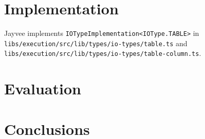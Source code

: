 \chapter{Implementation}
\label{chapter:Implementation}

Jayvee implements \texttt{IOTypeImplementation<IOType.TABLE>} in \texttt{libs/execution/src/lib/types/io-types/table.ts} and \texttt{libs/execution/src/lib/types/io-types/table-column.ts}.

\chapter{Evaluation}
\label{chapter:Evaluation}

\chapter{Conclusions}
\label{chapter:Conclusions}

